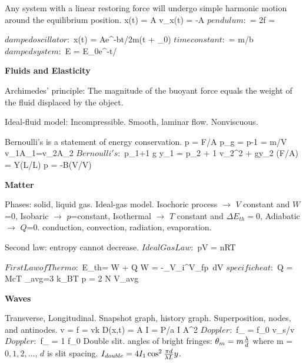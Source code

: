 {Any system with a linear restoring force will undergo simple harmonic motion around the equilibrium position.
\Dis 5pt 
\baselineskip=22pt
\Fm x(t) = A\Mf
\Fm v_x(t) = -\omega A\Mf
\Fm $pendulum: $ \omega = 2\pi f = \Mf

\Fm $damped oscillator: $ x(t) = Ae^{-bt/2m}\cos(\omega t + \phi_0)\Mf
\Fm $time constant: $ \tau = m/b\Mf
\Fm $damped system: $ E = E_0e^{-t/\tau}\Mf
\EndDis


{\bf Fluids and Elasticity}

Archimedes' principle: The magnitude of the buoyant force equals the weight of the fluid displaced by the object.

Ideal-fluid model: Incompressible. Smooth, laminar flow. Nonviscuous.

Bernoulli's is a statement of energy conservation.
\Dis 5pt 
\baselineskip=22pt
\Fm p = F/A\Mf
\Fm p_g = p-1\Mf
\Fm \rho = m/V \Mf
\Fm v_1A_1=v_2A_2\Mf
\Fm $Bernoulli's: $ p_1+{1 }\rho g y_1 = p_2 + {1 }\rho v_2^2 + \rho gy_2\Mf
\Fm (F/A) = Y(\Delta L/L)\Mf
\Fm p = -B(\Delta V/V)\Mf
\EndDis

{\bf Matter}

Phases: solid, liquid gas. Ideal-gas model. Isochoric process $\rightarrow$ $V$ constant and $W$=0, Isobaric $\rightarrow$ $p$=constant, Isothermal $\rightarrow$ $T$ constant and $\Delta E_{th}=0$, Adiabatic $\rightarrow$ $Q$=0. conduction, convection, radiation, evaporation. 

Second law: entropy cannot decrease.
\Dis 5pt 
\baselineskip=22pt
\Fm $Ideal Gas Law: $ pV = nRT \Mf

\Fm $First Law of Thermo: $ \Delta E_{th}= W + Q \Mf
\Fm W = -\int_{V_{\rm i}}^{V_{\rm f}}{p\ dV} \Mf
\Fm $specific heat: $ Q = Mc\Delta T \Mf
\Fm \epsilon_{\rm avg}={3 }k_{\rm B}T\Mf
\Fm p = {2 }{N \over V}\epsilon_{\rm avg}\Mf
\EndDis

{\bf Waves}

Transverse, Longitudinal.  Snapshot graph, history graph. Superposition, nodes, and antinodes.
\Dis 5pt 
\baselineskip=22pt
\Fm v = \lambda f\Mf
\Fm \omega = vk\Mf
\Fm D(x,t) = A\Mf
\Fm I = P/a\Mf
\Fm I \propto A^2\Mf
\Fm $Doppler: $ f_{\pm} = {f_0  \mp v_s/v}\Mf
\Fm $Doppler: $ f_{\pm} = 1 f_0 \Mf
\EndDis
Double slit. angles of bright fringes: $\theta_m=m{\lambda \over d}$ where m = $0,1,2,\dots$, $d$ is slit spacing.
\quad $I_{double}=4I_1\cos^2{{\pi d \over \lambda L}y}$.

}
